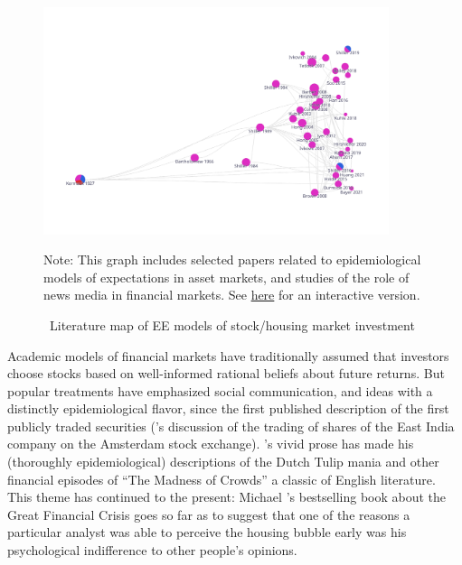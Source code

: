 


\begin{figure}[!ht] \centering  %
  \caption{ ~Literature map of EE models of stock/housing market investment}
  \label{fig:graph_investment}
  \centerline{\includegraphics[width=0.9\textwidth]{./figures/graph_investment}}
  \begin{flushleft}
    {\footnotesize Note: This graph includes selected papers related to epidemiological models of expectations in asset markets, and studies of the role of news media in financial markets. See \href{https://app.litmaps.co/shared/E25276CA-8725-437B-8241-11961EFB3FB4}{here} for an interactive version.}
  \end{flushleft}
\end{figure}

Academic models of financial markets have traditionally assumed that investors choose stocks based on well-informed rational beliefs about future returns.  But popular treatments have emphasized social communication, and ideas with a distinctly epidemiological flavor, since the first published description of  the first publicly traded securities (\cite{vegaConfusion}'s discussion of the trading of shares of the East India company on the Amsterdam stock exchange).  \cite{mackay1850memoirs}'s vivid prose has made his (thoroughly epidemiological) descriptions of the Dutch Tulip mania and other financial episodes of ``The Madness of Crowds'' a classic of English literature.  This theme has continued to the present: Michael \cite{lewis2011big}'s bestselling book about the Great Financial Crisis goes so far as to suggest that one of the reasons a particular analyst was able to perceive the housing bubble early was his psychological indifference to other people's opinions.

